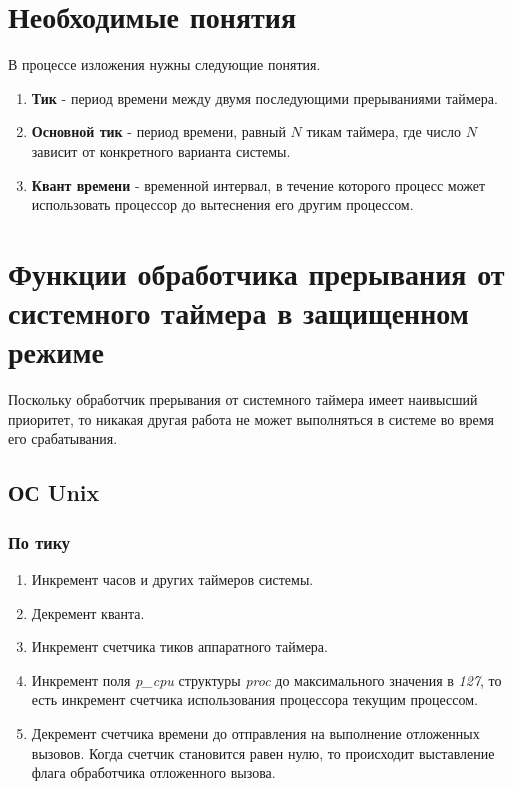 \setcounter{page}{2}

\chapter{Необходимые понятия}

В процессе изложения нужны следующие понятия.

\begin{enumerate}
    \item \textbf{Тик} - период времени между двумя последующими прерываниями таймера.
    \item \textbf{Основной тик} - период времени, равный $N$ тикам таймера, где число $N$ зависит от конкретного варианта системы. 
    \item \textbf{Квант времени} - временной интервал, в течение которого процесс может использовать процессор до вытеснения его другим процессом.
\end{enumerate}


\chapter{Функции обработчика прерывания от системного таймера в защищенном режиме}

Поскольку обработчик прерывания от системного таймера имеет наивысший приоритет, то никакая другая работа не может выполняться в системе во время его срабатывания.

\section{ОС Unix}
\subsection{По тику}
\begin{enumerate}
    \item Инкремент часов и других таймеров системы.
    \item Декремент кванта.
    \item Инкремент счетчика тиков аппаратного таймера.
    \item Инкремент поля \textit{p\_cpu} структуры  \textit{proc} до максимального значения в \textit{127}, то есть инкремент счетчика использования процессора текущим процессом.
    \item Декремент счетчика времени до отправления на выполнение отложенных вызовов. Когда счетчик становится равен нулю, то происходит выставление флага обработчика отложенного вызова.
\end{enumerate}


